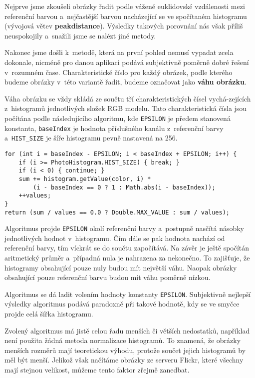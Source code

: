 \documentclass[12pt,oneside,a4paper]{article}
\newenvironment{listing}
{\begin{list}{}{\setlength{\leftmargin}{1em}}\item\scriptsize\bfseries}
{\end{list}}
\begin{document}
Nejprve jsme zkoušeli obrázky řadit podle vážené euklidovské vzdálenosti mezi referenční barvou a~nejčastější barvou nacházející se ve spočítaném histogramu (vývojová větev \textbf{peakdistance}). Výsledky takových porovnání nás však příliš neuspokojily a~snažili jsme se nalézt jiné metody.

Nakonec jsme došli k~metodě, která na první pohled nemusí vypadat zcela dokonale, nicméně pro danou aplikaci podává subjektivně poměrně dobré řešení v~rozumném čase. Charakteristické číslo pro každý obrázek, podle kterého budeme obrázky v~této variantě řadit, budeme označovat jako \textbf{váhu obrázku}.

Váha obrázku se vždy skládá ze součtu tří charakteristických čísel vychá-zejících z~histogramů jednotlivých složek RGB modelu. Tato charakteristická čísla jsou počítána podle následujícího algoritmu, kde \texttt{EPSILON} je předem stanovená konstanta, \texttt{baseIndex} je hodnota příslušného kanálu z~referenční barvy a~\texttt{HIST\_SIZE} je šíře histogramu pevně nastavená na 256.

\begin{listing}
\begin{verbatim}
for (int i = baseIndex - EPSILON; i < baseIndex + EPSILON; i++) {
    if (i >= PhotoHistogram.HIST_SIZE) { break; }
    if (i < 0) { continue; }
    sum += histogram.getValue(color, i) *
        (i - baseIndex == 0 ? 1 : Math.abs(i - baseIndex));
    ++values;
}
return (sum / values == 0.0 ? Double.MAX_VALUE : sum / values);
\end{verbatim}
\end{listing}

Algoritmus projde \texttt{EPSILON} okolí referenční barvy a~postupně nasčítá násobky jednotlivých hodnot v~histogramu. Čím dále se pak hodnota nachází od referenční barvy, tím víckrát se do součtu započítává. Na závěr je ještě spočítán aritmetický průměr a~případná nula je nahrazena za nekonečno. To zajišťuje, že histogramy obsahující pouze nuly budou mít největší váhu. Naopak obrázky obsahující pouze referenční barvu budou mít váhu poměrně nízkou.

Algoritmus se dá ladit volením hodnoty konstanty \texttt{EPSILON}. Subjektivně nejlepší výsledky algoritmus podává paradoxně při takové hodnotě, kdy se ve smyčce projde celá šířka histogramu.

Zvolený algoritmus má jistě celou řadu menších či větších nedostatků, například není použita žádná metoda normalizace histogramů. To znamená, že obrázky menších rozměrů mají teoretickou výhodu, protože součet jejich histogramů by měl být menší. Jelikož však načítáme obrázky ze serveru Flickr, které všechny mají stejnou velikost, můžeme tento faktor zřejmě zanedbat.
\end{document}
